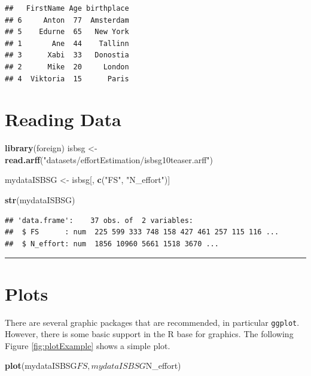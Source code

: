 \documentclass[]{book}
\newenvironment{Shaded}{\begin{snugshade}}{\end{snugshade}}
\newcommand{\KeywordTok}[1]{\textcolor[rgb]{0.13,0.29,0.53}{\textbf{{#1}}}}
\newcommand{\StringTok}[1]{\textcolor[rgb]{0.31,0.60,0.02}{{#1}}}
\newcommand{\NormalTok}[1]{{#1}}
\begin{document}
\begin{verbatim}
##   FirstName Age birthplace
## 6     Anton  77  Amsterdam
## 5    Edurne  65   New York
## 1       Ane  44    Tallinn
## 3      Xabi  33   Donostia
## 2      Mike  20     London
## 4  Viktoria  15      Paris
\end{verbatim}

\section{Reading Data}\label{reading-data}

\begin{Shaded}
\begin{Highlighting}[]
\KeywordTok{library}\NormalTok{(foreign)}
\NormalTok{isbsg <-}\StringTok{ }\KeywordTok{read.arff}\NormalTok{(}\StringTok{"datasets/effortEstimation/isbsg10teaser.arff"}\NormalTok{)}

\NormalTok{mydataISBSG <-}\StringTok{ }\NormalTok{isbsg[, }\KeywordTok{c}\NormalTok{(}\StringTok{"FS"}\NormalTok{, }\StringTok{"N_effort"}\NormalTok{)]}

\KeywordTok{str}\NormalTok{(mydataISBSG)}
\end{Highlighting}
\end{Shaded}

\begin{verbatim}
## 'data.frame':    37 obs. of  2 variables:
##  $ FS      : num  225 599 333 748 158 427 461 257 115 116 ...
##  $ N_effort: num  1856 10960 5661 1518 3670 ...
\end{verbatim}

\begin{center}\rule{0.5\linewidth}{\linethickness}\end{center}

\section{Plots}\label{plots}

There are several graphic packages that are recommended, in particular
\texttt{ggplot}. However, there is some basic support in the R base for
graphics. The following Figure \ref{fig:plotExample} shows a simple
plot.

\begin{Shaded}
\begin{Highlighting}[]
\KeywordTok{plot}\NormalTok{(mydataISBSG$FS, mydataISBSG$N_effort)}
\end{Highlighting}
\end{Shaded}
\end{document}
